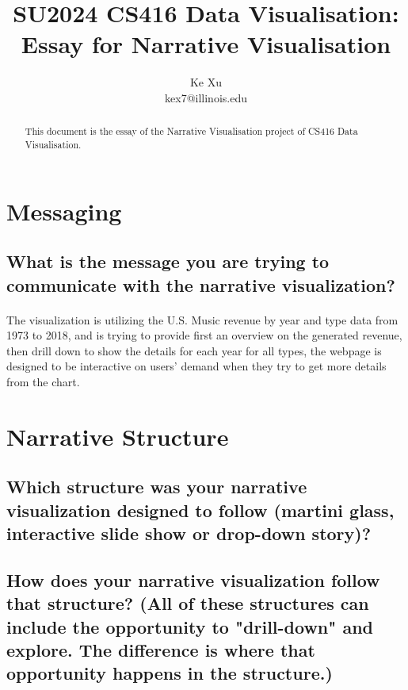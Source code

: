 \documentclass[letterpaper, 11pt]{article}
\title{SU2024 CS416 Data Visualisation: Essay for Narrative Visualisation}
\author{Ke Xu\\ kex7@illinois.edu}
\begin{document}
\maketitle

\begin{abstract}
This document is the essay of the Narrative Visualisation project of CS416 Data Visualisation.
\end{abstract}

\section{Messaging}
\label{sec:Messaging}


\subsection{What is the message you are trying to communicate with the narrative visualization?}
\label{subsec:1}
\paragraph{} The visualization is utilizing the U.S. Music revenue by year and type data from 1973 to 2018, and is trying to provide first an overview on the generated revenue, then
drill down to show the details for each year for all types, the webpage is designed to be interactive on users' demand when they try to get more details from the chart.


\section{Narrative Structure}
\label{sec:NarrativeStructure}
\subsection{Which structure was your narrative visualization designed to follow (martini glass, interactive slide show or drop-down story)?}
\label{subsec:NarrativeStructure1}

\subsection{How does your narrative visualization follow that structure? (All of these structures can include the opportunity to "drill-down" and explore. The difference is where that opportunity happens in the structure.)}
\label{subsec:NarrativeStructure2}
\end{document}
